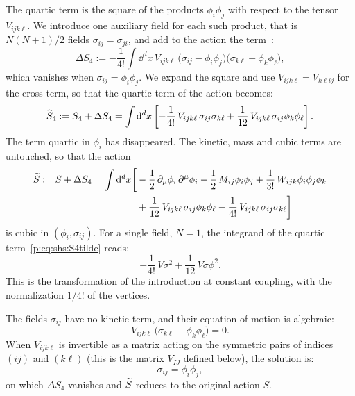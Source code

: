 The quartic term is the square of the products $\phi_i \phi_j$ with respect to the tensor $V_{ijk\ell}$.
We introduce one auxiliary field for each such product, that is $N (N + 1) / 2$ fields $\sigma_{ij} = \sigma_{ji}$, and add to the action the term~\cite{Stratonovich:1957:MethodCalculatingQuantum, Hubbard:1959:CalculationPartitionFunctions, Weinberg:2005:QuantumTheoryFields-2}:
\begin{equation}
\label{p:eq:shs:DeltaS4}
\Delta S_4
  := - \frac{1}{4!} \int \dd^d x \, V_{ijk\ell} \, \big(
    \sigma_{ij} - \phi_i \phi_j
  \big) \big(
    \sigma_{k\ell} - \phi_k \phi_\ell
  \big),
\end{equation}
which vanishes when $\sigma_{ij} = \phi_i \phi_j$.
We expand the square and use $V_{ijk\ell} = V_{k\ell ij}$ for the cross term, so that the quartic term of the action becomes:
\begin{equation}
\label{p:eq:shs:S4tilde}
\caction[4]
  := S_4 + \Delta S_4
  = \int \dd^d x \left[
    - \frac{1}{4!} \, V_{ijk\ell} \, \sigma_{ij} \sigma_{k\ell}
    + \frac{1}{12} \, V_{ijk\ell} \, \sigma_{ij} \phi_k \phi_\ell
  \right].
\end{equation}
The term quartic in $\phi_i$ has disappeared.
The kinetic, mass and cubic terms are untouched, so that the action
\begin{equation}
\label{p:eq:shs:action-tilde}
\begin{aligned}
  \caction
    := S + \Delta S_4
    = \int \dd^d x \bigg[
      &
      - \frac{1}{2} \, \partial_\mu \phi_i \, \partial^\mu \phi_i
      - \frac{1}{2} \, M_{ij} \phi_i \phi_j
      + \frac{1}{3!} \, W_{ijk} \phi_i \phi_j \phi_k
      \\ &
      + \frac{1}{12} \, V_{ijk\ell} \, \sigma_{ij} \phi_k \phi_\ell
      - \frac{1}{4!} \, V_{ijk\ell} \, \sigma_{ij} \sigma_{k\ell}
    \bigg]
\end{aligned}
\end{equation}
is cubic in $(\phi_i, \sigma_{ij})$.
For a single field, $N = 1$, the integrand of the quartic term~\eqref{p:eq:shs:S4tilde} reads:
\begin{equation}
- \frac{1}{4!} \, V \sigma^2
+ \frac{1}{12} \, V \sigma \phi^2.
\end{equation}
This is the transformation of the introduction at constant coupling, with the normalization $1 / 4!$ of the vertices.

The fields $\sigma_{ij}$ have no kinetic term, and their equation of motion is algebraic:
\begin{equation}
\label{p:eq:shs:eom-sigma}
V_{ijk\ell} \, \big( \sigma_{k\ell} - \phi_k \phi_\ell \big)
  = 0.
\end{equation}
When $V_{ijk\ell}$ is invertible as a matrix acting on the symmetric pairs of indices $(ij)$ and $(k\ell)$ (this is the matrix $V_{IJ}$ defined below), the solution is:
\begin{equation}
\label{p:eq:shs:solution}
\sigma_{ij}
  = \phi_i \phi_j,
\end{equation}
on which $\Delta S_4$ vanishes and $\caction$ reduces to the original action $S$.


